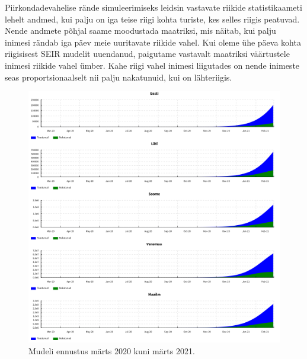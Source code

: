 \documentclass[a4paper]{article}
\begin{document}
  Piirkondadevahelise rände simuleerimiseks leidsin vastavate riikide statistikaameti lehelt
  andmed, kui palju on iga teise riigi kohta turiste, kes selles riigis peatuvad.
  Nende andmete põhjal saame moodustada maatriksi, mis näitab, kui palju inimesi rändab
  iga päev meie uuritavate riikide vahel. Kui oleme ühe päeva kohta riigisisest
  SEIR mudelit uuendanud, paigutame vastavalt maatriksi väärtustele inimesi riikide
  vahel ümber. Kahe riigi vahel inimesi liigutades on nende inimeste seas proportsionaalselt
  nii palju nakatunuid, kui on lähteriigis. 

  \begin{figure}
    \centering
    \includegraphics[width=\textwidth]{graphics/year.png}
    \caption{Mudeli ennustus märts 2020 kuni märts 2021.}
  \end{figure}
\end{document}
